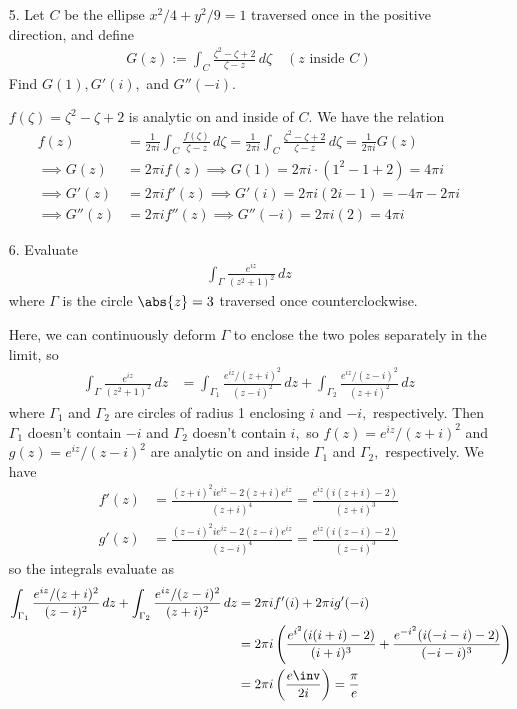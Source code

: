 \documentclass{article}
\begin{document}
\begin{itemize}
\begin{itemize}
		\end{itemize}

	\item[5.] Let $C$ be the ellipse $x^2/4+y^2/9=1$ traversed once in the positive direction, and define
		\begin{align*}
			G(z):= \int_C \frac{\zeta^2-\zeta+2}{\zeta-z}\, d\zeta\quad (z\text{ inside } C)
		\end{align*}
		Find $G(1), G'(i),$ and $G''(-i).$
		\begin{soln}
			$f(\zeta) = \zeta^2-\zeta+2$ is analytic on and inside of $C.$ We have the relation
			\begin{align*}
				f(z) &= \frac{1}{2\pi i} \int_C \frac{f(\zeta)}{\zeta-z}\, d\zeta = \frac{1}{2\pi i} \int_C \frac{\zeta^2-\zeta+2}{\zeta-z}\, d\zeta = \frac{1}{2\pi i} G(z) \\
				\implies G(z) &= 2\pi i f(z) \implies G(1) = 2\pi i\cdot(1^2-1+2) = 4\pi i \\
				\implies G'(z) &= 2\pi i f'(z) \implies G'(i) = 2\pi i(2i-1) = -4\pi - 2\pi i \\
				\implies G''(z) &= 2\pi i f''(z) \implies G''(-i) = 2\pi i(2) = 4\pi i
			\end{align*}
		\end{soln}

	\item[6.] Evaluate 
		\begin{align*}
			\int_\Gamma \frac{e^{iz}}{(z^2+1)^2}\, dz
		\end{align*}
		where $\Gamma$ is the circle $\abs{z}=3$ traversed once counterclockwise. 
		\begin{soln}
			Here, we can continuously deform $\Gamma$ to enclose the two poles separately in the limit, so
			\begin{align*}
				\int_\Gamma \frac{e^{iz}}{(z^2+1)^2}\, dz &= \int_{\Gamma_1} \frac{e^{iz}/(z+i)^2}{(z-i)^2}\, dz + \int_{\Gamma_2} \frac{e^{iz}/(z-i)^2}{(z+i)^2}\, dz
			\end{align*}
			where $\Gamma_1$ and $\Gamma_2$ are circles of radius 1 enclosing $i$ and $-i,$ respectively. Then $\Gamma_1$ doesn't contain $-i$ and $\Gamma_2$ doesn't contain $i,$ so $f(z)=e^{iz}/(z+i)^2$ and $g(z)=e^{iz}/(z-i)^2$ are analytic on and inside $\Gamma_1$ and $\Gamma_2,$ respectively. We have
			\begin{align*}
				f'(z) &= \frac{(z+i)^2ie^{iz} - 2(z+i)e^{iz}}{(z+i)^4} = \frac{e^{iz}(i(z+i)-2)}{(z+i)^3} \\
				g'(z) &= \frac{(z-i)^2ie^{iz} - 2(z-i)e^{iz}}{(z-i)^4} = \frac{e^{iz}(i(z-i) - 2)}{(z-i)^3}
			\end{align*}
			so the integrals evaluate as
			\begin{align*}
				\int_{\Gamma_1} \frac{e^{iz}/(z+i)^2}{(z-i)^2}\, dz + \int_{\Gamma_2} \frac{e^{iz}/(z-i)^2}{(z+i)^2}\, dz &= 2\pi i f'(i) + 2\pi i g'(-i) \\
				&= 2\pi i \left( \frac{e^{i^2}(i(i+i)-2)}{(i+i)^3} + \frac{e^{-i^2}(i(-i-i)-2)}{(-i-i)^3} \right) \\
				&= 2\pi i \left( \frac{e\inv}{2i} \right) = \frac{\pi}{e}
			\end{align*}
		\end{soln}


\end{itemize}
\end{document}
